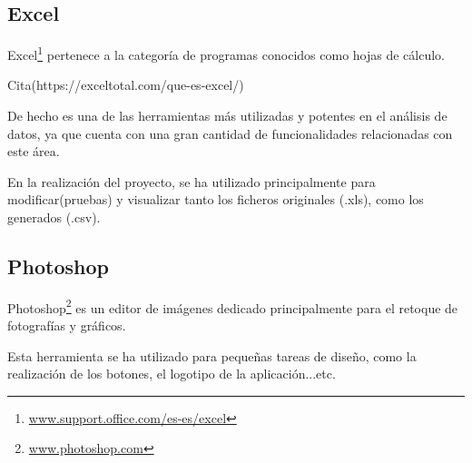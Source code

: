 \subsection{Excel}\label{excel}
Excel\footnote{\href{https://support.office.com/es-es/excel}{www.support.office.com/es-es/excel}} pertenece a la categoría de programas conocidos como hojas de cálculo. 

Cita(https://exceltotal.com/que-es-excel/)

De hecho es una de las herramientas más utilizadas y potentes en el análisis de datos, ya que cuenta con una gran cantidad de funcionalidades relacionadas con este área.

En la realización del proyecto, se ha utilizado principalmente para modificar(pruebas) y visualizar tanto los ficheros originales (.xls), como los generados (.csv). 


\subsection{Photoshop}\label{photoshop}
Photoshop\footnote{\href{https://www.photoshop.com/}{www.photoshop.com}} es un editor de imágenes dedicado principalmente para el retoque de fotografías y gráficos. 

Esta herramienta se ha utilizado para pequeñas tareas de diseño, como la realización de los botones, el logotipo de la aplicación...etc.
